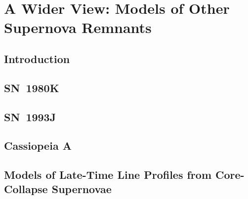 \chapter{A Wider View: Models of Other Supernova Remnants}\label{chp:chp6}

%
%



\section{Introduction}
\section{SN~1980K}
\section{SN~1993J}
\section{Cassiopeia A}

\section{Models of Late-Time Line Profiles from Core-Collapse Supernovae}

